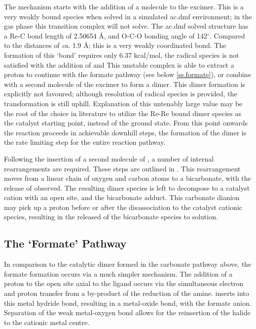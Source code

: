 The mechanism starts with the addition of a  molecule to the excimer. This is a very weakly bound species when solved in a simulated \gls{ac.dmf} environment; in the gas phase this transition complex will not solve. The \gls{ac.dmf} solved structure has a Re-C bond length of 2.50654 \r{A}, and O-C-O bonding angle of 142$^\circ$. Compared to the  distances of \textit{ca}. 1.9 \r{A}; this is a very weakly coordinated bond. The formation of this `bond' requires only 6.37 kcal/mol, the radical species is not satisfied with the addition of  and  This unstable complex is able to extract a proton to continue with the formate pathway (see below \autoref{ss.formate}), or combine with a second molecule of the excimer to form a dimer. This dimer formation is explicitly not favoured; although resolution of radical species is provided, the transformation is still  uphill. Explanation of this untenably large value may be the root of the choice in literature to utilize the Re-Re bound dimer species as the catalyst starting point, instead of the ground state. From this point onwards the reaction proceeds in achievable downhill steps, the formation of the dimer is the rate limiting step for the entire reaction pathway. 

Following the insertion of a second molecule of , a number of internal rearrangements are required. These steps are outlined in . This rearrangement moves from a linear chain of oxygen and carbon atoms to a bicarbonate, with the release of  observed. The resulting dimer species is left to decompose to a catalyst cation with an open site, and the bicarbonate adduct. This carbonate dianion may pick up a proton before or after the disassociation to the catalyst cationic species, resulting in the released of the bicarbonate species to solution. 

\subsection{The `Formate' Pathway}\label{ss.formate}
In comparison to the catalytic dimer formed in the carbonate pathway above, the formate formation occurs via a much simpler mechanism. The addition of a proton to the open site axial to the ligand occurs via the simultaneous electron and proton transfer from a by-product of the reduction of the amine.  inserts into this metal hydride bond, resulting in a metal-oxide bond, with the formate anion. Separation of the weak metal-oxygen bond allows for the reinsertion of the halide to the cationic metal centre. 

